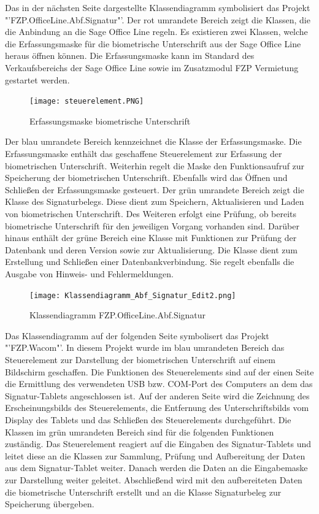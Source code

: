 \newline
Das in der nächsten Seite dargestellte Klassendiagramm symbolisiert das Projekt "'FZP.OfficeLine.Abf.Signatur"'. Der rot umrandete Bereich zeigt die Klassen, die die Anbindung an die Sage Office Line regeln. Es existieren zwei Klassen, welche die Erfassungsmaske für die biometrische Unterschrift aus der Sage Office Line heraus öffnen können. Die Erfassungsmaske kann im Standard des Verkaufsbereichs der Sage Office Line sowie im Zusatzmodul FZP Vermietung gestartet werden.
\begin{figure}[!ht]
    \centering
    \texttt{[image: steuerelement.PNG]}
    \caption[Erfassungsmaske biometrische Unterschrift]{\small{Erfassungsmaske biometrische Unterschrift}}
\end{figure}
\newline
Der blau umrandete Bereich kennzeichnet die Klasse der Erfassungsmaske. Die Erfassungsmaske enthält das geschaffene Steuerelement zur Erfassung der biometrischen Unterschrift. Weiterhin regelt die Maske den Funktionsaufruf zur Speicherung der biometrischen Unterschrift. Ebenfalls wird das Öffnen und Schließen der Erfassungsmaske gesteuert. Der grün umrandete Bereich zeigt die Klasse des Signaturbelegs. Diese dient zum Speichern, Aktualisieren und Laden von biometrischen Unterschrift. Des Weiteren erfolgt eine Prüfung, ob bereits biometrische Unterschrift für den jeweiligen Vorgang vorhanden sind. Darüber hinaus enthält der grüne Bereich eine Klasse mit Funktionen zur Prüfung der Datenbank und deren Version sowie zur Aktualisierung. Die Klasse dient zum Erstellung und Schließen einer Datenbankverbindung. Sie regelt ebenfalls die Ausgabe von Hinweis- und Fehlermeldungen.
\begin{figure}[!ht]
    \centering
    \texttt{[image: Klassendiagramm\_Abf\_Signatur\_Edit2.png]}
    \caption[Klassendiagramm FZP.OfficeLine.Abf.Signatur]{\small{Klassendiagramm FZP.OfficeLine.Abf.Signatur}}
\end{figure}
\newline
\pagebreak
\textbf{} %
\newline
Das Klassendiagramm auf der folgenden Seite symbolisert das Projekt "'FZP.Wacom"'. In diesem Projekt wurde im blau umrandeten Bereich das Steuerelement zur Darstellung der biometrischen Unterschrift auf einem Bildschirm geschaffen. Die Funktionen des Steuerelements sind auf der einen Seite die Ermittlung des verwendeten USB bzw. COM-Port des Computers an dem das Signatur-Tablets angeschlossen ist. Auf der anderen Seite wird die Zeichnung des Erscheinungsbilds des Steuerelements, die Entfernung des Unterschriftsbilds vom Display des Tablets und das Schließen des Steuerelements durchgeführt. Die Klassen im grün umrandeten Bereich sind für die folgenden Funktionen zuständig. Das Steuerelement reagiert auf die Eingaben des Signatur-Tablets und leitet diese an die Klassen zur Sammlung, Prüfung und Aufbereitung der Daten aus dem Signatur-Tablet weiter. Danach werden die Daten an die Eingabemaske zur Darstellung weiter geleitet. Abschließend wird mit den aufbereiteten Daten die biometrische Unterschrift erstellt und an die Klasse Signaturbeleg zur Speicherung übergeben.

